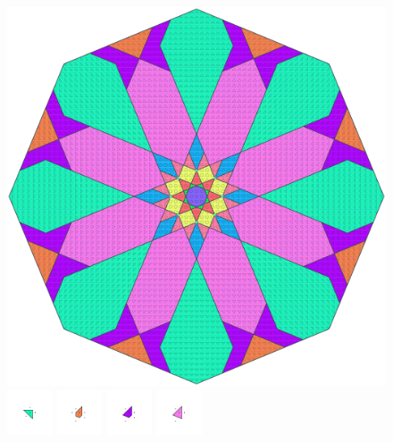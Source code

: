 \documentclass[text.tex]{subfiles}
\begin{document}
\clearpage
\pagestyle{fancy}
\fancyhf{}
\begin{figure}[h!]
\centering
\includegraphics[width=1\textwidth]{img/results/octagon/octagon_212132_(-3_3alpha_2).pdf}
\includegraphics[width=0.12\textwidth]{img/results/octagon/octagon_212132_(-3_3alpha_2)_001.pdf}
\includegraphics[width=0.12\textwidth]{img/results/octagon/octagon_212132_(-3_3alpha_2)_002.pdf}
\includegraphics[width=0.12\textwidth]{img/results/octagon/octagon_212132_(-3_3alpha_2)_003.pdf}
\includegraphics[width=0.12\textwidth]{img/results/octagon/octagon_212132_(-3_3alpha_2)_004.pdf}

\end{figure}
\end{document}
